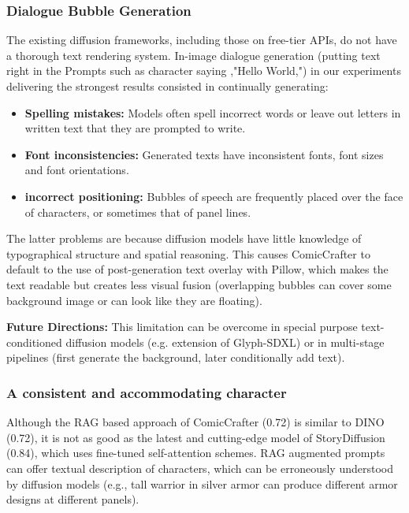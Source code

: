 \documentclass[runningheads]{llncs}
\begin{document}
\subsubsection{Dialogue Bubble Generation}

The existing diffusion frameworks, including those on free-tier APIs, do not have a thorough text rendering system. In-image dialogue generation (putting text right in the Prompts such as character saying ,"Hello World,") in our experiments delivering the strongest results consisted in continually generating:
\begin{itemize}
\item \textbf{Spelling mistakes:} Models often spell incorrect words or leave out letters in written text that they are prompted to write.
\item \textbf{Font inconsistencies:} Generated texts have inconsistent fonts, font sizes and font orientations.
\item \textbf{incorrect positioning:} Bubbles of speech are frequently placed over the face of characters, or sometimes that of panel lines.
\end{itemize}

The latter problems are because diffusion models have little knowledge of typographical structure and spatial reasoning. This causes ComicCrafter to default to the use of post-generation text overlay with Pillow, which makes the text readable but creates less visual fusion (overlapping bubbles can cover some background image or can look like they are floating).

\textbf{Future Directions:} This limitation can be overcome in special purpose text-conditioned diffusion models (e.g. extension of Glyph-SDXL) or in multi-stage pipelines (first generate the background, later conditionally add text).

\subsubsection{A consistent and accommodating character}

Although the RAG based approach of ComicCrafter (0.72) is similar to DINO (0.72), it is not as good as the latest and cutting-edge model of StoryDiffusion (0.84), which uses fine-tuned self-attention schemes. RAG augmented prompts can offer textual description of characters, which can be erroneously understood by diffusion models (e.g., tall warrior in silver armor can produce different armor designs at different panels).
\end{document}

